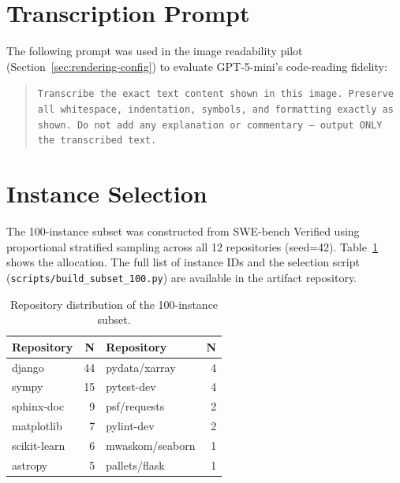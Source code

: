 \documentclass[sigconf,authorversion,nonacm]{acmart}
\begin{document}
\balance



\appendix
\section{Transcription Prompt}
The following prompt was used in the image readability pilot (Section~\ref{sec:rendering-config}) to evaluate GPT-5-mini's code-reading fidelity:

\begin{quote}
\small\texttt{Transcribe the exact text content shown in this image. Preserve all whitespace, indentation, symbols, and formatting exactly as shown. Do not add any explanation or commentary --- output ONLY the transcribed text.}
\end{quote}

\section{Instance Selection}
The 100-instance subset was constructed from SWE-bench Verified using proportional stratified sampling across all 12 repositories (seed=42). Table~\ref{tab:repo-dist} shows the allocation. The full list of instance IDs and the selection script (\texttt{scripts/build\_subset\_100.py}) are available in the artifact repository.

\begin{table}[h]
\centering
\caption{Repository distribution of the 100-instance subset.}
\label{tab:repo-dist}
\small
\begin{tabular}{lr|lr}
\toprule
\textbf{Repository} & \textbf{N} & \textbf{Repository} & \textbf{N} \\
\midrule
django       & 44 & pydata/xarray   & 4 \\
sympy        & 15 & pytest-dev      & 4 \\
sphinx-doc   &  9 & psf/requests    & 2 \\
matplotlib   &  7 & pylint-dev      & 2 \\
scikit-learn &  6 & mwaskom/seaborn & 1 \\
astropy      &  5 & pallets/flask   & 1 \\
\bottomrule
\end{tabular}
\end{table}
\end{document}
